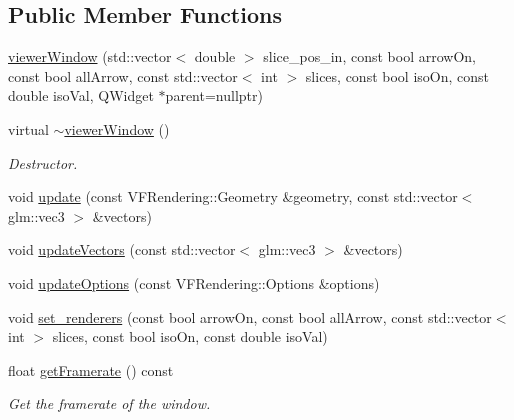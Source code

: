 \subsection*{Public Member Functions}
\begin{DoxyCompactItemize}
\item 
\hyperlink{classnMagWindows_1_1viewerWindow_a700e4bca76465101c5404ed3511af38f}{viewer\+Window} (std\+::vector$<$ double $>$ slice\+\_\+pos\+\_\+in, const bool arrow\+On, const bool all\+Arrow, const std\+::vector$<$ int $>$ slices, const bool iso\+On, const double iso\+Val, Q\+Widget $\ast$parent=nullptr)
\item 
virtual \hyperlink{classnMagWindows_1_1viewerWindow_abc66dbe51c1fd662eafcb14466382655}{$\sim$viewer\+Window} ()
\begin{DoxyCompactList}\small\item\em Destructor. \end{DoxyCompactList}\item 
void \hyperlink{classnMagWindows_1_1viewerWindow_a91e38c0e40f40aa4219c7b9bccfdca21}{update} (const V\+F\+Rendering\+::\+Geometry \&geometry, const std\+::vector$<$ glm\+::vec3 $>$ \&vectors)
\item 
void \hyperlink{classnMagWindows_1_1viewerWindow_aa93ecd1a2bc515804cc5780902111206}{update\+Vectors} (const std\+::vector$<$ glm\+::vec3 $>$ \&vectors)
\item 
void \hyperlink{classnMagWindows_1_1viewerWindow_ad3c57658a50c31f5680ca0149f4ed700}{update\+Options} (const V\+F\+Rendering\+::\+Options \&options)
\item 
void \hyperlink{classnMagWindows_1_1viewerWindow_a9336f6f66088169a5a4ce979755427ba}{set\+\_\+renderers} (const bool arrow\+On, const bool all\+Arrow, const std\+::vector$<$ int $>$ slices, const bool iso\+On, const double iso\+Val)
\item 
float \hyperlink{classnMagWindows_1_1viewerWindow_a8d1bdb9fd44982e2f82716a70bc5fb05}{get\+Framerate} () const 
\begin{DoxyCompactList}\small\item\em Get the framerate of the window. \end{DoxyCompactList}\end{DoxyCompactItemize}
